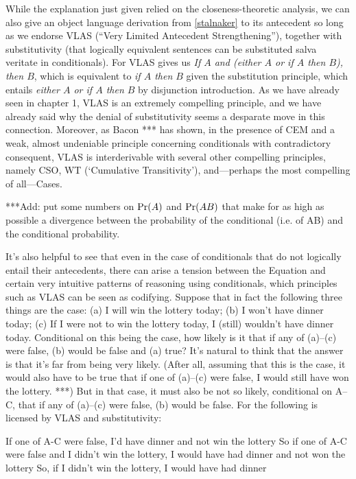 \documentclass[If.tex]{subfiles}
\begin{document}
While the explanation just given relied on the closeness-theoretic analysis, we can also give an object language derivation from \ref{stalnaker} to its antecedent so long as we endorse VLAS (“Very Limited Antecedent Strengthening”), together with substitutivity (that logically equivalent sentences can be substituted salva veritate in conditionals).  For VLAS gives us \emph{If $A$ and (either $A$ or if $A$ then $B$), then $B$}, which is equivalent to \emph{if $A$ then $B$} given the substitution principle, which entails \emph{either $A$ or if $A$ then $B$} by disjunction introduction.  As we have already seen in chapter 1, VLAS is an extremely compelling principle, and we have already said why the denial of substitutivity seems a desparate move in this connection.  Moreover, as Bacon *** has shown, in the presence of CEM and a weak, almost undeniable principle concerning conditionals with contradictory consequent, VLAS is interderivable with several other compelling principles, namely CSO, WT (‘Cumulative Transitivity’), and---perhaps the most compelling of all---Cases.  

***Add: put some numbers on $\operatorname{Pr}(A)$ and $\operatorname{Pr}(AB)$ that make for as high as possible a divergence between the probability of the conditional (i.e. of AB) and the conditional probability.  

It's also helpful to see that even in the case of conditionals that do not logically entail their antecedents, there can arise a tension between the Equation and certain very intuitive patterns of reasoning using conditionals, which principles such as VLAS can be seen as codifying.  Suppose that in fact the following three things are the case: (a) I will win the lottery today; (b) I won't have dinner today; (c) If I were not to win the lottery today, I (still) wouldn't have dinner today.  Conditional on this being the case, how likely is it that if any of (a)--(c) were false, (b) would be false and (a) true?  It's natural to think that the answer is that it's far from being very likely.  (After all, assuming that this is the case, it would also have to be true that if one of (a)--(c) were false, I would still have won the lottery.  ***)  But in that case, it must also be not so likely, conditional on A--C, that if any of (a)--(c) were false, (b) would be false.  For the following is licensed by VLAS and substitutivity:

If one of A-C were false, I'd have dinner and not win the lottery
So if one of A-C were false and I didn't win the lottery, I would have had dinner and not won the lottery
So, if I didn't win the lottery, I would have had dinner
\end{document}
